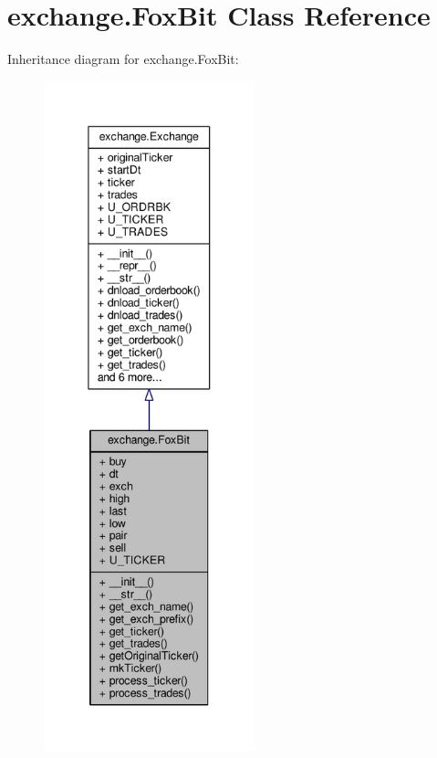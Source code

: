 \hypertarget{classexchange_1_1_fox_bit}{}\section{exchange.\+Fox\+Bit Class Reference}
\label{classexchange_1_1_fox_bit}


Inheritance diagram for exchange.\+Fox\+Bit\+:
\nopagebreak
\begin{figure}[H]
\begin{center}
\leavevmode
\includegraphics[height=550pt]{classexchange_1_1_fox_bit__inherit__graph}
\end{center}
\end{figure}


